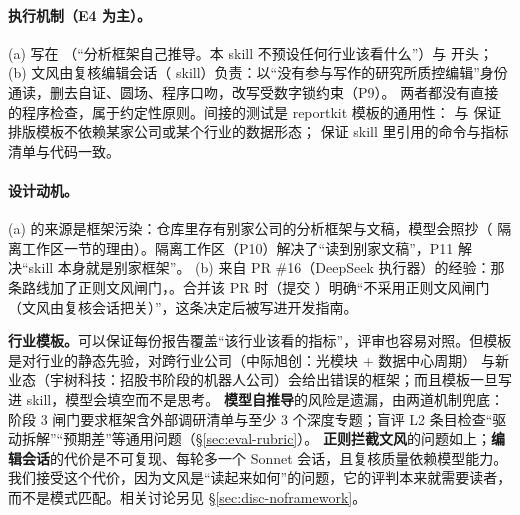 \paragraph{执行机制（E4 为主）。}(a) 写在 （“分析框架自己推导。本 skill 不预设任何行业该看什么”）与  开头；
(b) 文风由复核编辑会话（ skill）负责：以“没有参与写作的研究所质控编辑”身份通读，删去自证、圆场、程序口吻，改写受数字锁约束（P9）。
两者都没有直接的程序检查，属于约定性原则。间接的测试是 reportkit 模板的通用性： 与 
保证排版模板不依赖某家公司或某个行业的数据形态； 保证 skill 里引用的命令与指标清单与代码一致。

\paragraph{设计动机。}(a) 的来源是框架污染：仓库里存有别家公司的分析框架与文稿，模型会照抄（ 隔离工作区一节的理由）。隔离工作区（P10）解决了“读到别家文稿”，P11 解决“skill 本身就是别家框架”。
(b) 来自 PR \#16（DeepSeek 执行器）的经验：那条路线加了正则文风闸门，。合并该 PR 时（提交 ）明确“不采用正则文风闸门（文风由复核会话把关）”，这条决定后被写进开发指南。

\begin{tradeoff}
\textbf{行业模板。}可以保证每份报告覆盖“该行业该看的指标”，评审也容易对照。但模板是对行业的静态先验，对跨行业公司（中际旭创：光模块 + 数据中心周期）
与新业态（宇树科技：招股书阶段的机器人公司）会给出错误的框架；而且模板一旦写进 skill，模型会填空而不是思考。
\textbf{模型自推导}的风险是遗漏，由两道机制兜底：阶段 3 闸门要求框架含外部调研清单与至少 3 个深度专题；盲评 L2 条目检查“驱动拆解”“预期差”等通用问题（\S\ref{sec:eval-rubric}）。
\textbf{正则拦截文风}的问题如上；\textbf{编辑会话}的代价是不可复现、每轮多一个 Sonnet 会话，且复核质量依赖模型能力。
我们接受这个代价，因为文风是“读起来如何”的问题，它的评判本来就需要读者，而不是模式匹配。相关讨论另见 \S\ref{sec:disc-noframework}。
\end{tradeoff}

